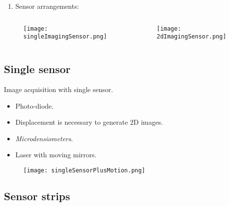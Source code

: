\begin{frame}
\begin{enumerate}
\item Sensor arrangements:
\end{enumerate}
\begin{columns}
\begin{column}{.7\textwidth}
\begin{figure}
\texttt{[image: singleImagingSensor.png]}
\end{figure}
\end{column}
\begin{column}{.3\textwidth}
\begin{figure}
\texttt{[image: 2dImagingSensor.png]}
\end{figure}
\end{column}
\end{columns}
\end{frame}


\subsection{Single sensor}


\begin{frame}
Image acquisition with single sensor.
\begin{itemize}
\item Photo-diode.
\item Displacement is necessary to generate 2D images.
\item \textit{Microdensiometers}.
\item Laser with moving mirrors.
\end{itemize}
\begin{figure}
\texttt{[image: singleSensorPlusMotion.png]}
\end{figure}
\end{frame}


\subsection{Sensor strips}


